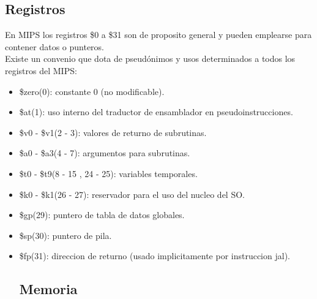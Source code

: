 \documentclass[12pt]{article}
\begin{document}
\subsection{Registros}
En MIPS los registros \$0 a \$31 son de proposito general y pueden emplearse
para contener datos o punteros.\\
Existe un convenio que dota de pseudónimos y usos determinados a todos los
registros del MIPS:
\begin{itemize}
\item \$zero(0): constante 0 (no modificable).
\item \$at(1): uso interno del traductor de ensamblador en pseudoinstrucciones.
\item \$v0 - \$v1(2 - 3): valores de returno de subrutinas.
\item \$a0 - \$a3(4 - 7): argumentos para subrutinas.
\item \$t0 - \$t9(8 - 15 , 24 - 25): variables temporales.
\item \$k0 - \$k1(26 - 27): reservador para el uso del nucleo del SO.
\item \$gp(29): puntero de tabla de datos globales.
\item \$sp(30): puntero de pila.
\item \$fp(31): direccion de returno (usado implicitamente por instruccion jal).
\subsection{Memoria}

\end{itemize}
\iffalse
Las arquitecturas MIPS siguen la filosofía RISC, por lo que cumplen con las siguientes directrices:
\item Es una arquitectura Load-Store, es decir, para operar con datos, estos deben cargarse desde
la memoria principal en registros internos de la CPU, donde quedan disponibles para operar con
ellos. Así, las únicas instrucciones que acceden a memoria principal son las de carga - almacenamiento.
Estando los datos en registros de la CPU, el acceso a ellos es muchísimo más rápido que si estuvieran en memoria principal.
\item Ya que las únicas instrucciones de acceso a memoria principal son las de carga - almacenamiento,
se dispone de pocos y sencillos modos de direccionamiento, lo que facilita
enormemente la decodificación de las instrucciones y la obtención de sus operandos.
\item La organización del formato de las instrucciones también es muy sencillo, lo que facilita su
decodificación, pues dispone de pocos formatos, compartiendo todos la misma longitud fija
de instrucción.
\item Ya que no se opera con los datos en memoria principal, se hace necesario disponer de un
generoso conjunto de registros generales para albergar los distintos datos del programa.
\fi
\end{document}
